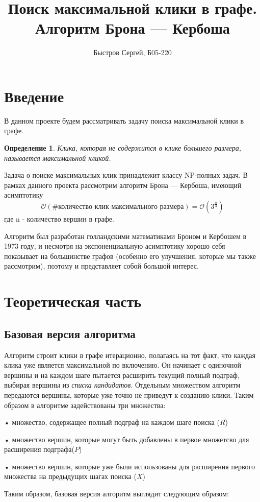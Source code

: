\documentclass{article}
\title{Поиск максимальной клики в графе.\\Алгоритм Брона — Кербоша}
\author{Быстров Сергей, Б05-220}
\date{}
\newtheorem{theorem}{Определение}
\begin{document}
\maketitle
\newpage
\tableofcontents

\newpage
\section{Введение}
В данном проекте будем рассматривать задачу поиска максимальной клики в графе.
\begin{theorem}
Клика, которая не содержится в клике большего
размера, называется максимальной кликой.
\end{theorem}
Задача о поиске максимальных клик принадлежит классу NP-полных задач. В рамках данного проекта рассмотрим алгоритм Брона — Кербоша, имеющий асимптотику $$\mathcal{O}(\#\text{количество клик максимального размера})=\mathcal{O}(3^\frac{n}{3})$$
где n - количество вершин в графе.

Алгоритм был разработан голландскими математиками Броном и Кербошем в 1973 году, и несмотря на экспоненциальную асимптотику хорошо себя показывает на большинстве графов (особенно его улучшения, которые мы также рассмотрим), поэтому и представляет собой большой интерес.

\newpage
\section{Теоретическая часть}
\subsection{Базовая версия алгоритма}
Алгоритм строит клики в графе итерационно, полагаясь на тот факт, что каждая клика уже является максимальной по включению. Он начинает с одиночной вершины и на каждом шаге пытается расширить текущий полный подграф, выбирая вершины из \textit{списка кандидатов}. Отдельным множеством алгоритм передаются вершины, которые уже точно не приведут к созданию клики. Таким образом в алгоритме задействованы три множества:

• множество, содержащее полный подграф на каждом шаге поиска ($R$)

• множество вершин, которые могут быть добавлены в первое множетсво для расширения подграфа($P$)

• множество вершин, которые уже были использованы для расширения первого множества на предыдущих шагах поиска ($X$)

Таким образом, базовая версия алгоритм  выглядит следующим образом:
\end{document}
